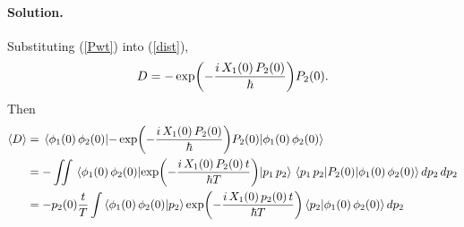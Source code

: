 \documentclass[11pt]{article}
\newcommand{\refeq}[1]{(\ref{#1})}
\newcommand{\beq}{\begin{equation*}}
\newcommand{\eeq}{\end{equation*}}
\newenvironment{solution}
{
    \paragraph{Solution.}
    \ignorespaces
}
{
}
\begin{document}
\begin{solution}

	Substituting \refeq{Pwt} into \refeq{dist},
	\beq
		D = -\exp(-\frac{i \, \Xqo \, \Pwo}{\hbar}) \Pwo.
	\eeq
	Then
	\begin{align*}
		\ev{D} &= \ev{-\exp(-\frac{i \, \Xqo \, \Pwo}{\hbar}) \Pwo}{\phio} \\
		&= -\iint \mel{\phio}{\exp(-\frac{i \, \Xqo \, \Pwo \, t}{\hbar T})}{\po} \mel{\po}{\Pwo}{\phio} \dd{\pq} \dd{\pw} \\
		&= - \pwo \frac{t}{T} \int \braket{\phio}{\pw} \exp(-\frac{i \, \Xqo \, \pwo \, t}{\hbar T}) \braket{\pw}{\phio} \dd{\pw}
	\end{align*}
\end{solution}


\end{document}
